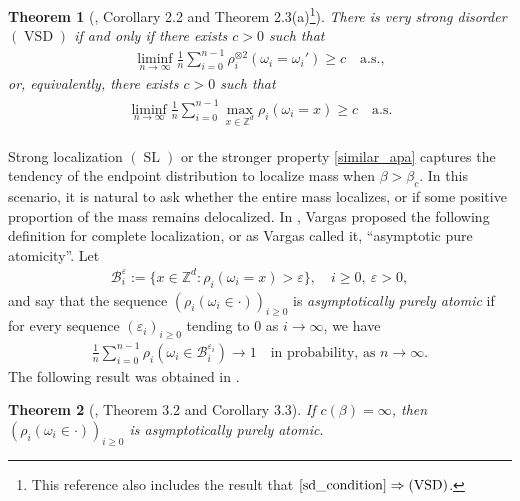 \documentclass[11pt,reqno]{amsart}
\numberwithin{equation}{section}
\newtheorem{thm}{Theorem}[section]
\theoremstyle{definition}
\begin{document}
\begin{thm}[\cite{comets-shiga-yoshida03}, Corollary 2.2 and Theorem 2.3(a)\footnote{This reference also includes the result that $\eqref{sd_condition} \Rightarrow (\operatorname{VSD})$.}] \label{characterization0}
There is very strong disorder $(\operatorname{VSD})$ if and only if there exists $c > 0$ such that
{\begin{align*} {
\liminf_{n \to \infty} \frac{1}{n} \sum_{i = 0}^{n-1} \rho_{i}^{\otimes 2}(\omega_i = \omega_i') \geq c \quad \mathrm{a.s.,}
} \end{align*}}
or, equivalently, there exists $c > 0$ such that
{\begin{align} \begin{split} {
\liminf_{n \to \infty} \frac{1}{n} \sum_{i = 0}^{n-1}  \max_{x \in {\mathbb{Z}}^d} \rho_{i}(\omega_i = x) \geq c \quad \mathrm{a.s.} \label{similar_apa}
} \end{split} \end{align}}
\end{thm}

Strong localization $(\operatorname{SL})$ or the stronger property \eqref{similar_apa} captures the tendency of the endpoint distribution to localize mass when $\beta > \beta_c$. 
In this scenario, it is natural to ask whether the entire mass localizes, or if some positive proportion of the mass remains delocalized.  In \cite{vargas07}, Vargas proposed the following definition for complete localization, or as Vargas called it, ``asymptotic pure atomicity''. Let
{\begin{align*} {
{\mathcal{B}}_i^{\varepsilon} := \{x \in {\mathbb{Z}}^d : \rho_{i}(\omega_i = x) > {\varepsilon}\}, \quad i \geq 0,\ {\varepsilon} > 0,
} \end{align*}} 
and say that the sequence $(\rho_{i}(\omega_i \in \cdot))_{i \geq 0}$ is \textit{asymptotically purely atomic} if for every sequence $({\varepsilon}_i)_{i \geq 0}$ tending to 0 as $i \to \infty$, we have
{\begin{align*} {
\frac{1}{n} \sum_{i = 0}^{n-1} \rho_{i}(\omega_i \in {\mathcal{B}}_i^{{\varepsilon}_i}) \to 1 \quad \text{in probability, as $n \to \infty$.}
} \end{align*}}
The following result was obtained in \cite{vargas07}. 

\begin{thm}[\cite{vargas07}, Theorem 3.2 and Corollary 3.3] \label{vargas_apa}
If $c(\beta) = \infty$, then $(\rho_{i}(\omega_i \in \cdot))_{i \geq 0}$ is asymptotically purely atomic.
\end{thm}
\end{document}
